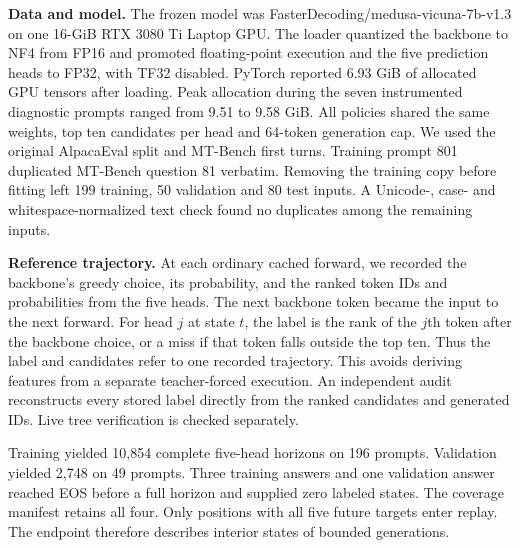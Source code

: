 \textbf{Data and model.} The frozen model was FasterDecoding/medusa-vicuna-7b-v1.3 on one 16-GiB RTX 3080 Ti Laptop GPU. The loader quantized the backbone to NF4 from FP16 and promoted floating-point execution and the five prediction heads to FP32, with TF32 disabled. PyTorch reported 6.93 GiB of allocated GPU tensors after loading. Peak allocation during the seven instrumented diagnostic prompts ranged from 9.51 to 9.58 GiB. All policies shared the same weights, top ten candidates per head and 64-token generation cap. We used the original AlpacaEval split and MT-Bench first turns. Training prompt 801 duplicated MT-Bench question 81 verbatim. Removing the training copy before fitting left 199 training, 50 validation and 80 test inputs. A Unicode-, case- and whitespace-normalized text check found no duplicates among the remaining inputs.

\textbf{Reference trajectory.} At each ordinary cached forward, we recorded the backbone's greedy choice, its probability, and the ranked token IDs and probabilities from the five heads. The next backbone token became the input to the next forward. For head $j$ at state $t$, the label is the rank of the $j$th token after the backbone choice, or a miss if that token falls outside the top ten. Thus the label and candidates refer to one recorded trajectory. This avoids deriving features from a separate teacher-forced execution. An independent audit reconstructs every stored label directly from the ranked candidates and generated IDs. Live tree verification is checked separately.

Training yielded 10,854 complete five-head horizons on 196 prompts. Validation yielded 2,748 on 49 prompts. Three training answers and one validation answer reached EOS before a full horizon and supplied zero labeled states. The coverage manifest retains all four. Only positions with all five future targets enter replay. The endpoint therefore describes interior states of bounded generations.

